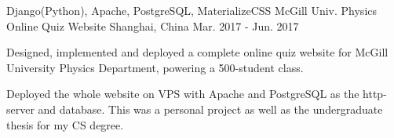 


\begin{cventries}


\cventry
{Django(Python), Apache, PostgreSQL, MaterializeCSS} %
{McGill Univ. Physics Online Quiz Website} %
{Shanghai, China} %
{Mar. 2017 - Jun. 2017} %
{ %
\begin{cvitems}
\item {Designed, implemented and deployed a complete online quiz website for McGill University Physics Department, powering a 500-student class.}
\item {Deployed the whole website on VPS with Apache and PostgreSQL as the http-server and database. This was a personal project as well as the undergraduate thesis for my CS degree.}
\end{cvitems}
}





\end{cventries}
